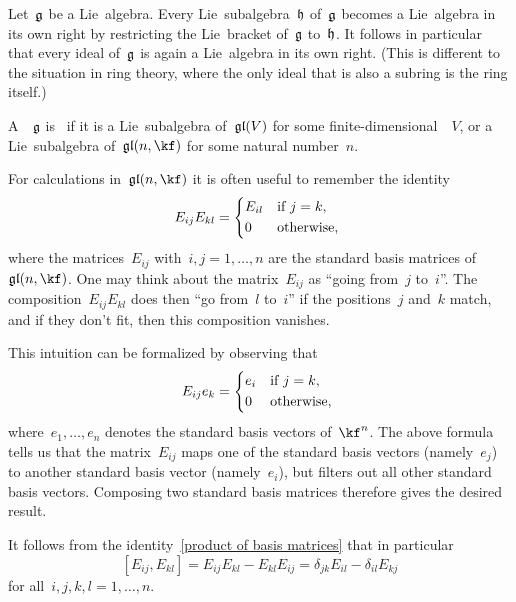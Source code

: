 \begin{remark}
	Let~$\mathfrak{g}$ be a Lie~algebra.
	Every Lie~subalgebra~$\mathfrak{h}$ of~$\mathfrak{g}$ becomes a Lie~algebra in its own right by restricting the Lie~bracket of~$\mathfrak{g}$ to~$\mathfrak{h}$.
	It follows in particular that every ideal of~$\mathfrak{g}$ is again a Lie~algebra in its own right.
	(This is different to the situation in ring theory, where the only ideal that is also a subring is the ring itself.)
\end{remark}


\begin{definition}
	A~\liealgebra{$\kf$}~$\mathfrak{g}$ is~ if it is a Lie~subalgebra of~$\mathfrak{gl}(V)$ for some finite-dimensional~\vectorspace{$\kf$}~$V$, or a Lie~subalgebra of~$\gllie(n, \kf)$ for some natural number~$n$.
\end{definition}


\begin{recall}
	For calculations in~$\gllie(n, \kf)$ it is often useful to remember the identity
	\begin{equation}
		\label{product of basis matrices}
		E_{ij} E_{kl}
		=
		\begin{cases*}
			E_{il}  & if~$j = k$, \\
			0       & otherwise,
		\end{cases*}
	\end{equation}
	where the matrices~$E_{ij}$ with~$i,j = 1, \dotsc, n$ are the standard basis matrices of~$\gllie(n, \kf)$.
	One may think about the matrix~$E_{ij}$ as \enquote{going from~$j$ to~$i$}.
	The composition~$E_{ij} E_{kl}$ does then \enquote{go from~$l$ to~$i$} if the positions~$j$ and~$k$ match, and if they don’t fit, then this composition vanishes.
	
	This intuition can be formalized by observing that
	\[
		E_{ij} e_k
		=
		\begin{cases*}
			e_i & if~$j = k$, \\
			0   & otherwise,
		\end{cases*}
	\]
	where~$e_1, \dotsc, e_n$ denotes the standard basis vectors of~$\kf^n$.
	The above formula tells us that the matrix~$E_{ij}$ maps one of the standard basis vectors (namely~$e_j$) to another standard basis vector (namely~$e_i$), but filters out all other standard basis vectors.
	Composing two standard basis matrices therefore gives the desired result.

	It follows from the identity~\eqref{product of basis matrices} that in particular
	\[
		[ E_{ij}, E_{kl} ]
		=
		E_{ij} E_{kl} - E_{kl} E_{ij}
		=
		\delta_{jk} E_{il} - \delta_{il} E_{kj}
	\]
	for all~$i, j, k, l = 1, \dotsc, n$.
\end{recall}



